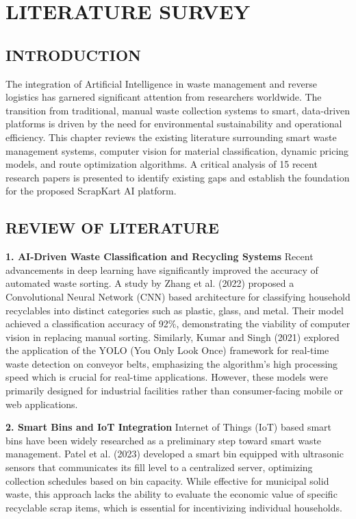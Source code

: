 \chapter{LITERATURE SURVEY}

\section{INTRODUCTION}
The integration of Artificial Intelligence in waste management and reverse logistics has garnered significant attention from researchers worldwide. The transition from traditional, manual waste collection systems to smart, data-driven platforms is driven by the need for environmental sustainability and operational efficiency. This chapter reviews the existing literature surrounding smart waste management systems, computer vision for material classification, dynamic pricing models, and route optimization algorithms. A critical analysis of 15 recent research papers is presented to identify existing gaps and establish the foundation for the proposed ScrapKart AI platform.

\section{REVIEW OF LITERATURE}

\textbf{1. AI-Driven Waste Classification and Recycling Systems}
Recent advancements in deep learning have significantly improved the accuracy of automated waste sorting. A study by Zhang et al. (2022) proposed a Convolutional Neural Network (CNN) based architecture for classifying household recyclables into distinct categories such as plastic, glass, and metal. Their model achieved a classification accuracy of 92\%, demonstrating the viability of computer vision in replacing manual sorting. Similarly, Kumar and Singh (2021) explored the application of the YOLO (You Only Look Once) framework for real-time waste detection on conveyor belts, emphasizing the algorithm's high processing speed which is crucial for real-time applications. However, these models were primarily designed for industrial facilities rather than consumer-facing mobile or web applications.

\textbf{2. Smart Bins and IoT Integration}
Internet of Things (IoT) based smart bins have been widely researched as a preliminary step toward smart waste management. Patel et al. (2023) developed a smart bin equipped with ultrasonic sensors that communicates its fill level to a centralized server, optimizing collection schedules based on bin capacity. While effective for municipal solid waste, this approach lacks the ability to evaluate the economic value of specific recyclable scrap items, which is essential for incentivizing individual households.

